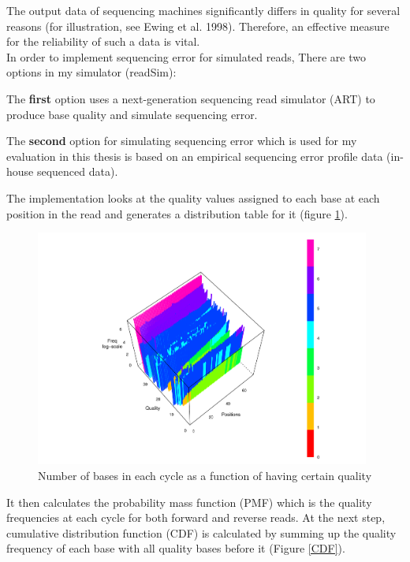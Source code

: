 \documentclass[11pt,a4paper]{report}
\begin{document}
The output data of sequencing machines significantly differs in quality for 
several reasons (for illustration, see Ewing et al. 1998).  Therefore, an 
effective measure for the reliability of such a data is vital\cite{phred1}.\\


In order to implement sequencing error for simulated reads, There are two
options in my simulator (readSim):

The \textbf{first} option uses a next-generation sequencing read simulator 
(ART) to produce base quality and simulate sequencing error.


The \textbf{second} option for simulating sequencing error which is used for
my evaluation in this thesis is based on an empirical sequencing error profile 
data (in-house sequenced data).

The implementation looks at the quality values assigned to each base at each
position in the read and generates a distribution table for it (figure \ref{hist}).

\begin{figure}[H]
\centering
\includegraphics[width=11cm]{pictures/3Dplot.pdf}
\caption{Number of bases in each cycle as a function of having certain quality}
\label{hist}
\end{figure}

It then calculates the probability mass function (PMF) which is the quality 
frequencies at each cycle for both forward and reverse reads. At the next 
step, cumulative distribution function (CDF) is calculated by summing up the 
quality frequency of each base with all quality bases before it (Figure \ref{CDF}).
\end{document}
